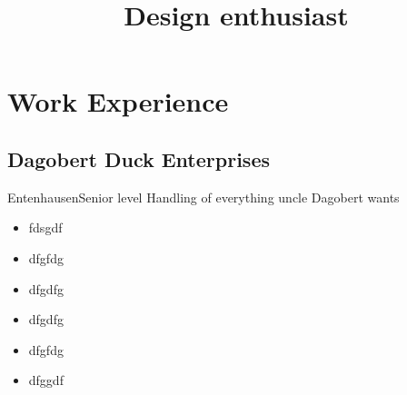 \documentclass[12pt,a4paper]{moderncv}
\title{Design enthusiast}
\begin{document}
\maketitle

\section{Work Experience}

\subsection{Dagobert Duck Enterprises}


{Entenhausen}{Senior level}
{Handling of everything uncle Dagobert wants}

\begin{itemize}
	\item fdsgdf
	\item dfgfdg
	\item dfgdfg
	\item dfgdfg
	\item dfgfdg
	\item dfggdf
	\end{itemize}
\end{document}
